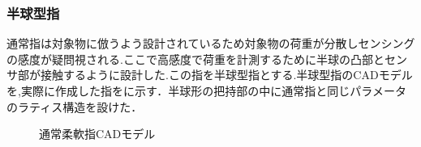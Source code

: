 \subsubsection{半球型指}

通常指は対象物に倣うよう設計されているため対象物の荷重が分散しセンシングの感度が疑問視される.ここで高感度で荷重を計測するために半球の凸部とセンサ部が接触するように設計した.この指を半球型指とする.半球型指のCADモデルを,実際に作成した指をに示す．半球形の把持部の中に通常指と同じパラメータのラティス構造を設けた．

\begin{figure}[h]
\centering
{}
\hspace{5mm}
\caption{通常柔軟指CADモデル}
\label{fig::soft_finger_CAD}
\end{figure}

